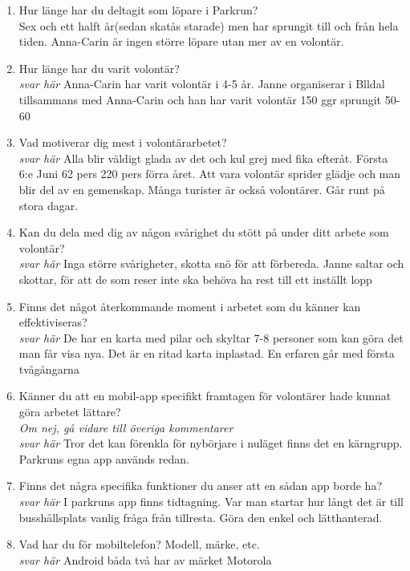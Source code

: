 \documentclass{article}
\begin{document}
\begin{enumerate}[label=\textbf{Fråga \arabic*:}]
    \item Hur länge har du deltagit som löpare i Parkrun?\\
        Sex och ett halft år(sedan skatås starade) men har sprungit till och från hela tiden. Anna-Carin är ingen större löpare utan mer av en volontär. 
    \item Hur länge har du varit volontär?\\
        \textit{svar här} Anna-Carin har varit volontär i 4-5 år. Janne organiserar i Blldal tillsammans med Anna-Carin och han har varit volontär 150 ggr sprungit 50-60
    \item Vad motiverar dig mest i volontärarbetet?\\
        \textit{svar här} Alla blir väldigt glada av det och kul grej med fika efteråt. 
Första 6:e Juni 62 pers 220 pers förra året. Att vara volontär sprider glädje och man blir del av en gemenskap. Många turister är också volontärer. Går runt på stora dagar.
    \item Kan du dela med dig av någon svårighet du stött på under ditt arbete som volontär?\\
        \textit{svar här} Inga större svårigheter, skotta snö för att förbereda. Janne saltar och skottar, för att de som reser inte ska behöva ha rest till ett inställt lopp
    \item Finns det något återkommande moment i arbetet som du känner kan effektiviseras?\\
        \textit{svar här} De har en karta med pilar och skyltar 7-8 personer som kan göra det man får visa nya. Det är en ritad karta inplastad.  En erfaren går med första tvågångarna 
    \item Känner du att en mobil-app specifikt framtagen för volontärer hade kunnat göra arbetet lättare?\\
    \textit{Om nej, gå vidare till överiga kommentarer}\\
        \textit{svar här} Tror det kan förenkla för nybörjare i nuläget finns det en kärngrupp. Parkruns egna app används redan. 
    \item Finns det några specifika funktioner du anser att en sådan app borde ha?\\
        \textit{svar här} I parkruns app finns tidtagning. Var man startar hur långt det är till busshållsplats vanlig fråga från tillresta. Göra den enkel och lätthanterad.  
    \item Vad har du för mobiltelefon? Modell, märke, etc.\\
        \textit{svar här}  Android båda två har av märket Motorola 
\end{enumerate}
\end{document}
